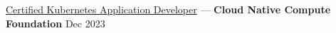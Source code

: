 

\href{https://www.credly.com/badges/f496c372-5779-49d9-b51a-58aff3c5963b/public_url}{Certified Kubernetes Application Developer} --- \textbf{Cloud Native Compute Foundation} \hfill Dec 2023

